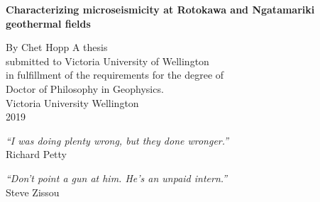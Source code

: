 \documentclass[a4paper,12pt,twoside,openright,english]{book}
\numberwithin{figure}{chapter}
\numberwithin{table}{chapter}
\begin{document}
\frontmatter

\begin{titlepage}
\doublespacing
	\begin{center}
	\vspace*{2\baselineskip}
		\textbf{\LARGE{Characterizing microseismicity at Rotokawa and Ngatamariki geothermal fields
}}

		\vspace*{2\baselineskip}
		By \vspace*{2\baselineskip}
		Chet Hopp \vspace*{2\baselineskip}
 \vspace*{1\baselineskip}
\singlespacing
		A thesis\\ submitted to Victoria University of Wellington\\
		in fulfillment of the requirements for the degree of
		\\Doctor of Philosophy in Geophysics.\\
		\vspace*{3\baselineskip}
		Victoria University Wellington\\2019
  \end{center}
\end{titlepage}
\singlespacing
\clearpage{\pagestyle{empty}\cleardoublepage} %

\thispagestyle{empty} %
  \begin{center}
		\emph{``I was doing plenty wrong, but they done wronger.''}\\
		\vspace*{1\baselineskip}
		Richard Petty
		
		\vspace*{4\baselineskip}
		\emph{``Don't point a gun at him. He's an unpaid intern.''}\\
		\vspace*{1\baselineskip}
		Steve Zissou
	\end{center}
\clearpage{\pagestyle{empty}\cleardoublepage}%
\frontmatter

\onehalfspacing

% 
% 
\end{document}
